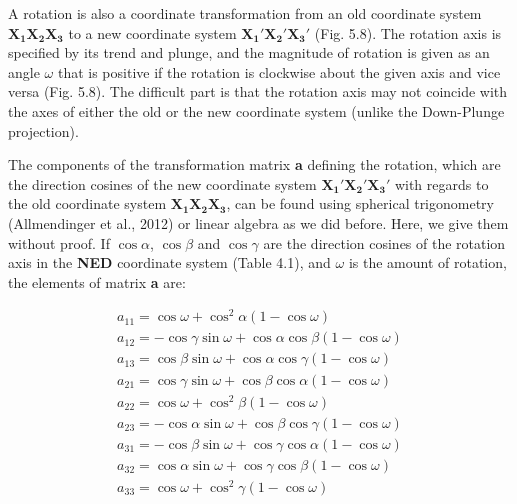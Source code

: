 \documentclass[a4paper , 12pt]{book}
\begin{document}
A rotation is also a coordinate transformation from an old coordinate system $\mathbf{X_1}\mathbf{X_2}\mathbf{X_3}$ to a new coordinate system $\mathbf{X_1\text{$'$}}\mathbf{X_2\text{$'$}}\mathbf{X_3\text{$'$}}$ (Fig. 5.8). The rotation axis is specified by its trend and plunge, and the magnitude of rotation is given as an angle $\omega$ that is positive if the rotation is clockwise about the given axis and vice versa (Fig. 5.8). The difficult part is that the rotation axis may not coincide with the axes of either the old or the new coordinate system (unlike the Down-Plunge projection).

The components of the transformation matrix \textbf{a} defining the rotation, which are the direction cosines of the new coordinate system $\mathbf{X_1\text{$'$}}\mathbf{X_2\text{$'$}}\mathbf{X_3\text{$'$}}$ with regards to the old coordinate system $\mathbf{X_1}\mathbf{X_2}\mathbf{X_3}$, can be found using spherical trigonometry (Allmendinger et al., 2012) or linear algebra as we did before. Here, we give them without proof. If $\cos\alpha$, $\cos\beta$ and $\cos\gamma$ are the direction cosines of the rotation axis in the \textbf{NED} coordinate system (Table 4.1), and $\omega$ is the amount of rotation, the elements of matrix \textbf{a} are:

\begin{equation}
    \begin{split}
        a_{11}=\cos\omega+\cos^2\alpha(1-\cos\omega) \hspace{30pt} \\
        a_{12}=-\cos\gamma\sin\omega+\cos\alpha\cos\beta(1-\cos\omega) \\
        a_{13}=\cos\beta\sin\omega+\cos\alpha\cos\gamma(1-\cos\omega) \hspace{7pt} \\
        a_{21}=\cos\gamma\sin\omega+\cos\beta\cos\alpha(1-\cos\omega) \hspace{7pt} \\
        a_{22}=\cos\omega+\cos^2\beta(1-\cos\omega) \hspace{30pt} \\
        a_{23}=-\cos\alpha\sin\omega+\cos\beta\cos\gamma(1-\cos\omega) \\
        a_{31}=-\cos\beta\sin\omega+\cos\gamma\cos\alpha(1-\cos\omega) \\
        a_{32}=\cos\alpha\sin\omega+\cos\gamma\cos\beta(1-\cos\omega) \hspace{7pt} \\
        a_{33}=\cos\omega+\cos^2\gamma(1-\cos\omega) \hspace{30pt}
    \end{split}
\end{equation}
\end{document}
